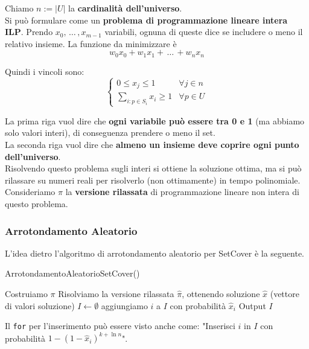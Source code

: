 Chiamo $n:= |U|$ la \textbf{cardinalità dell'universo}.\\

Si può formulare come un \textbf{problema di programmazione lineare intera ILP}. Prendo $x_0, \, \dots \, , x_{m-1}$ variabili, ognuna di queste dice se includere o meno il relativo insieme. La funzione da minimizzare è 
$$ w_0 x_0 + w_1 x_1 + \, \dots \, + w_n x_n $$

Quindi i vincoli sono:
$$ 
\begin{cases}
	0 \leq x_j \leq 1 & \forall j \in n \\
	\sum_{i: p \in S_i} x_i \geq 1  &\forall p \in U
\end{cases}
$$

La prima riga vuol dire che \textbf{ogni variabile può essere tra 0 e 1} (ma abbiamo solo valori interi), di conseguenza prendere o meno il set.\\
La seconda riga vuol dire che \textbf{almeno un insieme deve coprire ogni punto dell'universo}.\\

Risolvendo questo problema sugli interi si ottiene la soluzione ottima, ma si può rilassare su numeri reali per risolverlo (non ottimamente) in tempo polinomiale. Consideriamo $\hat \pi$ la \textbf{versione rilassata} di programmazione lineare non intera di questo problema.\\

\newpage

\subsubsection{Arrotondamento Aleatorio}

L'idea dietro l'algoritmo di arrotondamento aleatorio per SetCover è la seguente.

\begin{algorithm}
	\caption{ArrotondamentoAleatorioSetCover()}
	\begin{algorithmic}
		\STATE Costruiamo $\pi$
		\STATE Risolviamo la versione rilassata $\hat \pi$, ottenendo soluzione $\hat x$ (vettore di valori soluzione)
		\STATE $I \leftarrow \emptyset$
				\STATE aggiungiamo $i$ a $I$ con probabilità $\hat x_i$ 
			\ENDFOR
		\ENDFOR
		\STATE Output $I$
	\end{algorithmic}
\end{algorithm}

Il \texttt{for} per l'inserimento può essere visto anche come: "Inserisci $i$ in $I$ con probabilità $1 - (1-\hat x_i)^{k + \ln n}$".\\

